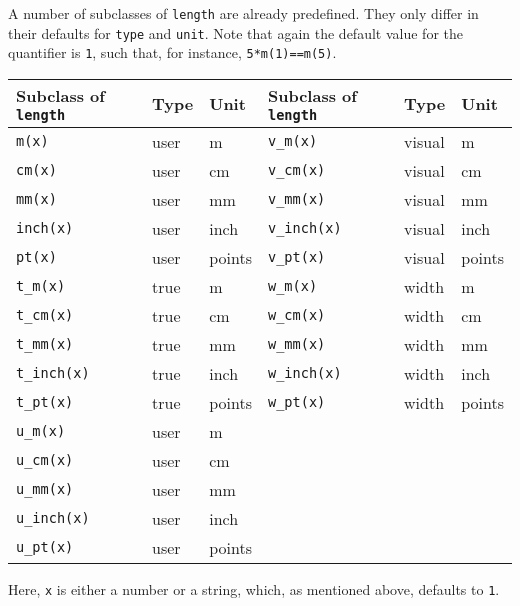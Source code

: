 A number of subclasses of \verb|length| are already predefined.  They
only differ in their defaults for \verb|type| and \verb|unit|. Note
that again the default value for the quantifier is \verb|1|, such that, for
instance, \texttt{5*m(1)==m(5)}.

\medskip
\begin{center}
\begin{tabular}{lll|lll}
Subclass of \texttt{length} & Type & Unit & Subclass of \texttt{length} & Type & Unit\\
\hline
\texttt{m(x)} & user & m & \texttt{v\_m(x)} & visual & m\\
\texttt{cm(x)} & user & cm & \texttt{v\_cm(x)} & visual & cm\\
\texttt{mm(x)} & user & mm & \texttt{v\_mm(x)} & visual & mm\\
\texttt{inch(x)} & user & inch & \texttt{v\_inch(x)} & visual & inch\\
\texttt{pt(x)} & user & points & \texttt{v\_pt(x)} & visual & points\\
\texttt{t\_m(x)} & true & m & \texttt{w\_m(x)} & width & m\\
\texttt{t\_cm(x)} & true & cm & \texttt{w\_cm(x)} & width & cm\\
\texttt{t\_mm(x)} & true & mm & \texttt{w\_mm(x)} & width & mm\\
\texttt{t\_inch(x)} & true & inch & \texttt{w\_inch(x)} & width & inch\\
\texttt{t\_pt(x)} & true & points & \texttt{w\_pt(x)} & width & points\\
\texttt{u\_m(x)} & user & m & \\
\texttt{u\_cm(x)} & user & cm & \\
\texttt{u\_mm(x)} & user & mm & \\
\texttt{u\_inch(x)} & user & inch & \\
\texttt{u\_pt(x)} & user & points & \\

\end{tabular}
\end{center}
\medskip
Here, \verb|x| is either a number or a string, which, as mentioned
above, defaults to \texttt{1}.

